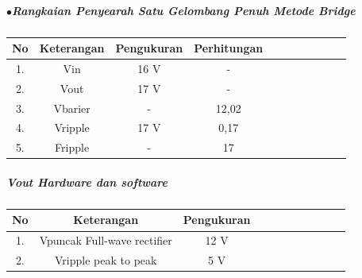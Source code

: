 \documentclass[12pt,a4paper]{article}
\begin{document}
\subparagraph*{$\bullet$\textbf{Rangkaian Penyearah Satu Gelombang Penuh Metode Bridge}}
\subparagraph*{ }
\begin{tabular}{|c|c|c|c|c|c|c|c|c|c|c|}        \hline
No & Keterangan & Pengukuran & Perhitungan \\ \hline 
1. & Vin 		& 16 V 			& - 	\\ \hline
2. & Vout 		& 17 V 			& - 	\\ \hline
3. & Vbarier 	& - 		& 12,02 	\\ \hline
4. & Vripple 	& 17 V 		& 0,17 		\\ \hline
5. & Fripple 	& - 		& 17	 	\\ \hline

 \end{tabular}

\subparagraph*{\textbf{Vout Hardware dan software}}
\begin{tabular}{|c|c|c|c|c|c|c|c|c|c|c|}        \hline
No & Keterangan & Pengukuran 			\\ \hline 
1. & Vpuncak Full-wave rectifier & 12 V \\ \hline
2. & Vripple peak to peak  		 & 5 V \\ \hline
\end{tabular}

\newpage
\end{document}
